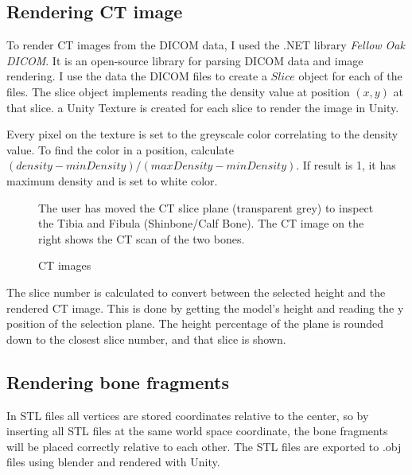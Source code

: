 \documentclass[a4paper]{report}
\begin{document}
\subsection{Rendering CT image}

To render CT images from the DICOM data, I used the .NET library \emph{Fellow Oak DICOM}\cite{noauthor_fellow_2022}. It is an open-source library for parsing DICOM data and image rendering.
I use the data the DICOM files to create a $Slice$ object for each of the files. The slice object implements reading the density value at position $(x, y)$ at that slice. a Unity Texture is created for each slice to render the image in Unity.

Every pixel on the texture is set to the greyscale color correlating to the density value. To find the color in a position, calculate $(density-minDensity)/(maxDensity-minDensity)$. If result is 1, it has maximum density and is set to white color.

\begin{figure}[h!]
    \centering
	\hfill
  \caption{CT images}
  \small
  The user has moved the CT slice plane (transparent grey) to inspect the Tibia and Fibula (Shinbone/Calf Bone). The CT image on the right shows the CT scan of the two bones.
~\cite{mishra_virtual_2019}
\end{figure}

The slice number is calculated to convert between the selected height and the rendered CT image. This is done by getting the model's height and reading the y position of the selection plane. The height percentage of the plane is rounded down to the closest slice number, and that slice is shown.

\subsection{Rendering bone fragments}
In STL files all vertices are stored coordinates relative to the center, so by inserting all STL files at the same world space coordinate, the bone fragments will be placed correctly relative to each other. The STL files are exported to .obj files using blender and rendered with Unity.
\end{document}

